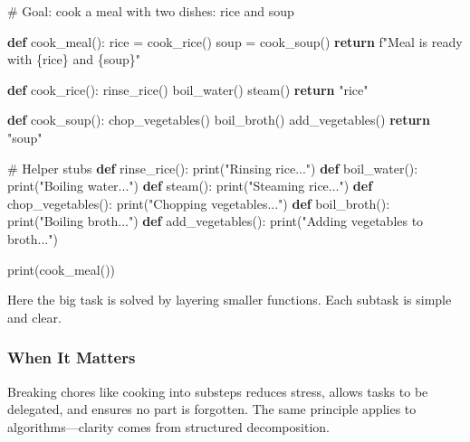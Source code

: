 \documentclass[
  letterpaper,
  DIV=11,
  numbers=noendperiod]{scrreprt}
\newenvironment{Shaded}{\begin{snugshade}}{\end{snugshade}}
\newcommand{\BuiltInTok}[1]{\textcolor[rgb]{0.00,0.23,0.31}{#1}}
\newcommand{\CommentTok}[1]{\textcolor[rgb]{0.37,0.37,0.37}{#1}}
\newcommand{\ControlFlowTok}[1]{\textcolor[rgb]{0.00,0.23,0.31}{\textbf{#1}}}
\newcommand{\KeywordTok}[1]{\textcolor[rgb]{0.00,0.23,0.31}{\textbf{#1}}}
\newcommand{\NormalTok}[1]{\textcolor[rgb]{0.00,0.23,0.31}{#1}}
\newcommand{\OperatorTok}[1]{\textcolor[rgb]{0.37,0.37,0.37}{#1}}
\newcommand{\SpecialCharTok}[1]{\textcolor[rgb]{0.37,0.37,0.37}{#1}}
\newcommand{\SpecialStringTok}[1]{\textcolor[rgb]{0.13,0.47,0.30}{#1}}
\newcommand{\StringTok}[1]{\textcolor[rgb]{0.13,0.47,0.30}{#1}}
\begin{document}
\begin{Shaded}
\begin{Highlighting}[]
\CommentTok{\# Goal: cook a meal with two dishes: rice and soup}

\KeywordTok{def}\NormalTok{ cook\_meal():}
\NormalTok{    rice }\OperatorTok{=}\NormalTok{ cook\_rice()}
\NormalTok{    soup }\OperatorTok{=}\NormalTok{ cook\_soup()}
    \ControlFlowTok{return} \SpecialStringTok{f"Meal is ready with }\SpecialCharTok{\{}\NormalTok{rice}\SpecialCharTok{\}}\SpecialStringTok{ and }\SpecialCharTok{\{}\NormalTok{soup}\SpecialCharTok{\}}\SpecialStringTok{"}

\KeywordTok{def}\NormalTok{ cook\_rice():}
\NormalTok{    rinse\_rice()}
\NormalTok{    boil\_water()}
\NormalTok{    steam()}
    \ControlFlowTok{return} \StringTok{"rice"}

\KeywordTok{def}\NormalTok{ cook\_soup():}
\NormalTok{    chop\_vegetables()}
\NormalTok{    boil\_broth()}
\NormalTok{    add\_vegetables()}
    \ControlFlowTok{return} \StringTok{"soup"}

\CommentTok{\# Helper stubs}
\KeywordTok{def}\NormalTok{ rinse\_rice(): }\BuiltInTok{print}\NormalTok{(}\StringTok{"Rinsing rice..."}\NormalTok{)}
\KeywordTok{def}\NormalTok{ boil\_water(): }\BuiltInTok{print}\NormalTok{(}\StringTok{"Boiling water..."}\NormalTok{)}
\KeywordTok{def}\NormalTok{ steam(): }\BuiltInTok{print}\NormalTok{(}\StringTok{"Steaming rice..."}\NormalTok{)}
\KeywordTok{def}\NormalTok{ chop\_vegetables(): }\BuiltInTok{print}\NormalTok{(}\StringTok{"Chopping vegetables..."}\NormalTok{)}
\KeywordTok{def}\NormalTok{ boil\_broth(): }\BuiltInTok{print}\NormalTok{(}\StringTok{"Boiling broth..."}\NormalTok{)}
\KeywordTok{def}\NormalTok{ add\_vegetables(): }\BuiltInTok{print}\NormalTok{(}\StringTok{"Adding vegetables to broth..."}\NormalTok{)}

\BuiltInTok{print}\NormalTok{(cook\_meal())}
\end{Highlighting}
\end{Shaded}

Here the big task is solved by layering smaller functions. Each subtask
is simple and clear.

\subsubsection{When It Matters}\label{when-it-matters-29}

Breaking chores like cooking into substeps reduces stress, allows tasks
to be delegated, and ensures no part is forgotten. The same principle
applies to algorithms---clarity comes from structured decomposition.
\end{document}
